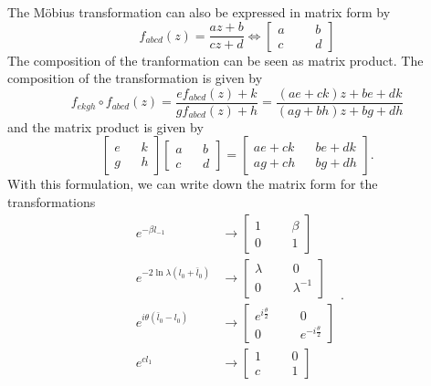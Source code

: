 \documentclass[a4paper,11pt]{article}
\begin{document}
The Möbius transformation can also be expressed in matrix form by
\begin{equation}
    f_{abcd}(z)=\frac{az+b}{cz+d}\iff\begin{bmatrix}
    a&&&b\\
    c&&&d
    \end{bmatrix}
\end{equation}
The composition of the tranformation can be seen as matrix product. The composition of the transformation is given by
\begin{equation}
    f_{ekgh}\circ f_{abcd}(z)=\frac{ef_{abcd}(z)+k}{gf_{abcd}(z)+h}=\frac{(ae+ck)z+be+dk}{(ag+bh)z+bg+dh}
\end{equation}
and the matrix product is given by
\begin{equation}
    \begin{bmatrix}
    e&&k\\
    g&&h
    \end{bmatrix}
    \begin{bmatrix}
    a && b\\
    c && d
    \end{bmatrix}=\begin{bmatrix}
    ae+ck && be+dk\\
    ag+ch && bg+dh
    \end{bmatrix}.
\end{equation}
With this formulation, we can write down the matrix form for the transformations
\begin{equation}
\begin{aligned}
e^{-\beta l_{-1}}&\rightarrow\begin{bmatrix}1 &&&\beta\\0&&&1
\end{bmatrix}\\
e^{-2\ln\lambda(l_0+\bar{l}_0)}&\rightarrow\begin{bmatrix}\lambda&&&0\\0&&&\lambda^{-1}
\end{bmatrix}\\
e^{i\theta(\bar{l}_0-l_0)}&\rightarrow\begin{bmatrix}
e^{i\frac{\theta}{2}}&&&0\\0&&&e^{-i\frac{\theta}{2}}
\end{bmatrix}\\
e^{cl_1}&\rightarrow\begin{bmatrix}
1&&&0\\c&&&1
\end{bmatrix}
\end{aligned}.
\end{equation}
\end{document}
